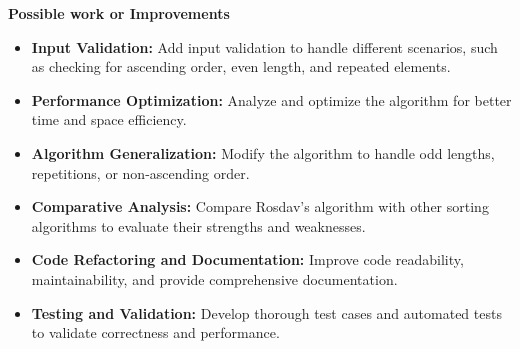 \documentclass[12pt]{article}
\begin{document}
\bigskip \textbf{Possible work or Improvements}
\begin{itemize}
\item \textbf{Input Validation:} Add input validation to handle different scenarios, such as checking for ascending order, even length, and repeated elements.

\item \textbf{Performance Optimization:}  Analyze and optimize the algorithm for better time and space efficiency.

\item \textbf{Algorithm Generalization:}  Modify the algorithm to handle odd lengths, repetitions, or non-ascending order.

\item \textbf{Comparative Analysis:}  Compare Rosdav's algorithm with other sorting algorithms to evaluate their strengths and weaknesses.

\item \textbf{Code Refactoring and Documentation:}  Improve code readability, maintainability, and provide comprehensive documentation.

\item \textbf{Testing and Validation:}  Develop thorough test cases and automated tests to validate correctness and performance.

\end{itemize}
\end{document}
